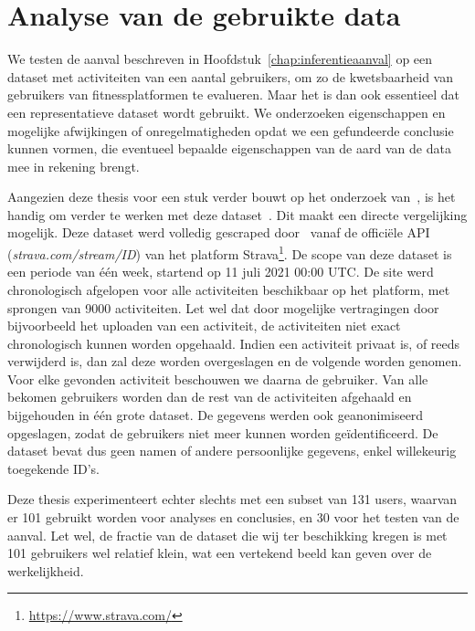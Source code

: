 \chapter{Analyse van de gebruikte data}
We testen de aanval beschreven in Hoofdstuk~\ref{chap:inferentieaanval} op een
dataset met activiteiten van een aantal gebruikers, om zo de kwetsbaarheid van
gebruikers van fitnessplatformen te evalueren. Maar het is dan ook essentieel
dat een representatieve dataset wordt gebruikt. We onderzoeken eigenschappen en
mogelijke afwijkingen of onregelmatigheden opdat we een gefundeerde conclusie
kunnen vormen, die eventueel bepaalde eigenschappen van de aard van de data mee
in rekening brengt.

Aangezien deze thesis voor een stuk verder bouwt op het onderzoek
van~\citeauthor{Dhondt}, is het handig om verder te werken met deze
dataset~\cite{Dhondt}. Dit maakt een directe vergelijking mogelijk. Deze
dataset werd volledig gescraped door~\citeauthor{Dhondt} vanaf de officiële
\ac{API} (\textit{strava.com/stream/ID}) van het platform
Strava\footnote{\url{https://www.strava.com/}}. De scope van deze dataset is
een periode van één week, startend op 11 juli 2021 00:00 \ac{UTC}. De site werd
chronologisch afgelopen voor alle activiteiten beschikbaar op het platform, met
sprongen van 9000 activiteiten. Let wel dat door mogelijke vertragingen door
bijvoorbeeld het uploaden van een activiteit, de activiteiten niet exact
chronologisch kunnen worden opgehaald. Indien een activiteit privaat is, of
reeds verwijderd is, dan zal deze worden overgeslagen en de volgende worden
genomen. Voor elke gevonden activiteit beschouwen we daarna de gebruiker. Van
alle bekomen gebruikers worden dan de rest van de activiteiten afgehaald en
bijgehouden in één grote dataset. De gegevens werden ook geanonimiseerd
opgeslagen, zodat de gebruikers niet meer kunnen worden geïdentificeerd. De
dataset bevat dus geen namen of andere persoonlijke gegevens, enkel willekeurig
toegekende ID's.

Deze thesis experimenteert echter slechts met een subset van 131 users, waarvan
er 101 gebruikt worden voor analyses en conclusies, en 30 voor het testen van
de aanval. Let wel, de fractie van de dataset die wij ter beschikking kregen is
met 101 gebruikers wel relatief klein, wat een vertekend beeld kan geven over
de werkelijkheid.

